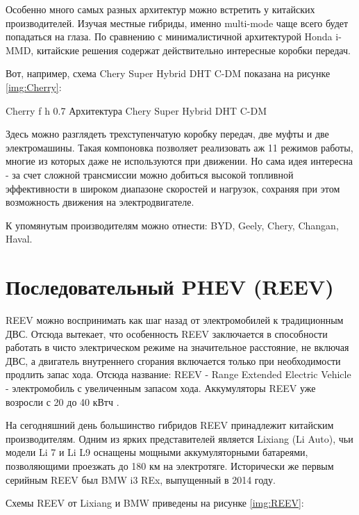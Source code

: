 Особенно много самых разных архитектур можно встретить у китайских производителей. Изучая местные гибриды, именно multi-mode чаще всего будет попадаться на глаза. По сравнению с минималистичной архитектурой Honda i-MMD, китайские решения содержат действительно интересные коробки передач.

Вот, например, схема Chery Super Hybrid DHT C-DM показана на рисунке \ref{img:Cherry}:

    {Cherry} %
    {f} %
    {h} %
    {0.7\textwidth} %
    {Архитектура Chery Super Hybrid DHT C-DM} %

Здесь можно разглядеть трехступенчатую коробку передач, две муфты и две электромашины. Такая компоновка позволяет реализовать аж 11 режимов работы, многие из которых даже не используются при движении. Но сама идея интересна - за счет сложной трансмиссии можно добиться высокой топливной эффективности в широком диапазоне скоростей и нагрузок, сохраняя при этом возможность движения на электродвигателе.

К упомянутым производителям можно отнести: BYD, Geely, Chery, Changan, Haval.

\newpage

\section{Последовательный PHEV (REEV)}

REEV можно воспринимать как шаг назад от электромобилей к традиционным ДВС. Отсюда вытекает, что особенность REEV заключается в способности работать в чисто электрическом режиме на значительное расстояние, не включая ДВС, а двигатель внутреннего сгорания включается только при необходимости продлить запас хода. Отсюда название: REEV - Range Extended Electric Vehicle - электромобиль с увеличенным запасом хода. Аккумуляторы REEV уже возросли с 20 до 40 кВтч \cite{PHEVreport}.

На сегодняшний день большинство гибридов REEV принадлежит китайским производителям. Одним из ярких представителей является Lixiang (Li Auto), чьи модели Li 7 и Li L9 оснащены мощными аккумуляторными батареями, позволяющими проезжать до 180 км на электротяге. Исторически же первым серийным REEV был BMW i3 REx, выпущенный в 2014 году.

Схемы REEV от Lixiang и BMW приведены на рисунке \ref{img:REEV}:

